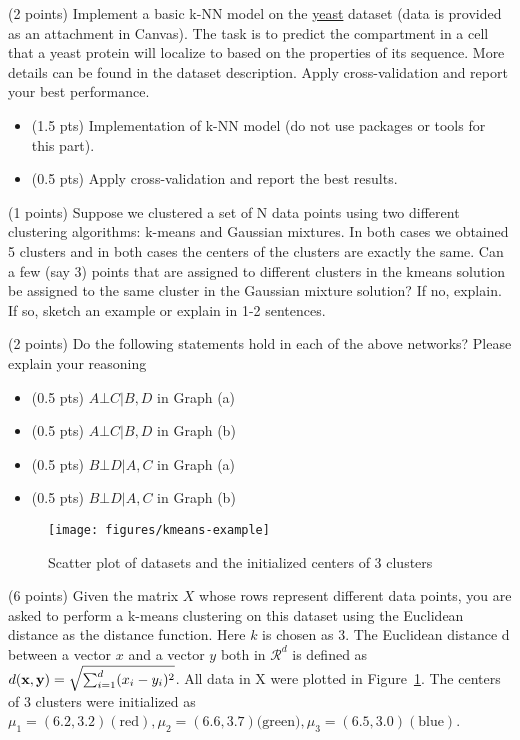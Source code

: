 \documentclass{exam}
\newcommand{\xx}{{\bf{x}}}
\newcommand{\yy}{{\bf{y}}}
\begin{document}
\begin{questions}

\label{q1} (2 points)  Implement a basic k-NN model on the \href{http://archive.ics.uci.edu/ml/datasets/yeast}{yeast} dataset (data is provided as an attachment in Canvas). The task is to predict the compartment in a cell that a yeast protein will localize to based on the properties of its sequence. More details can be found in the dataset description. Apply cross-validation and report your best performance.
\begin{itemize}
    \item (1.5 pts) Implementation of k-NN model (do not use packages or tools for this part).
    \item (0.5 pts) Apply cross-validation and report the best results.
\end{itemize}


\newpage
{}\label{q1} (1 points)  Suppose we clustered a set of N data points using two different clustering algorithms: k-means and Gaussian mixtures. In both cases we obtained 5 clusters and in both cases the centers of the clusters are exactly the same. Can a few (say 3) points that are assigned to different clusters in the kmeans solution be assigned to the same cluster in the Gaussian mixture solution? If no, explain. If
so, sketch an example or explain in 1-2 sentences.

\newpage
\begin{figure}
\centering
{}
\end{figure}
\label{q2} (2 points)
Do the following statements hold in each of the above networks? Please explain your reasoning
\begin{itemize}
\item (0.5 pts) $A\bot C | B, D$ in Graph (a)
\item (0.5 pts) $A\bot C | B, D$ in Graph (b)
\item (0.5 pts) $B\bot D | A,C$ in Graph (a)
\item (0.5 pts) $B\bot D | A,C$ in Graph (b)
\end{itemize}


\newpage
\begin{figure}
\centering
\texttt{[image: figures/kmeans-example]}
\caption{Scatter plot of datasets and the initialized centers of 3 clusters}\label{fig:kmeans}
\end{figure}
\label{q3} (6 points)  Given the matrix $X$ whose rows represent different data points, you are asked to perform a k-means clustering on this dataset using the Euclidean distance as the distance function. Here $k$ is chosen as $3$. The Euclidean distance d between a vector $x$ and a vector $y$ both in $\mathcal{R}^d$ is defined as $d(\xx, \yy) = \sqrt{\sum_{i=1}^d (x_i - y_i)^2}$. All data in X were plotted in Figure~\ref{fig:kmeans}. The centers of $3$ clusters were initialized as $\mu_1= (6.2, 3.2) (\text{red}), \mu_2 = (6.6, 3.7) (\text{green)}, \mu_3 = (6.5, 3.0) (\text{blue})$.


\end{questions}
\end{document}
